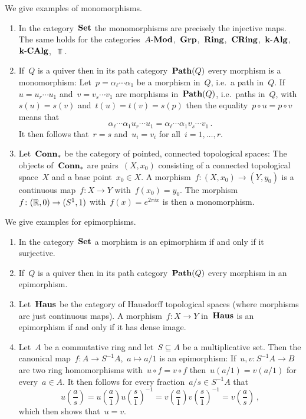 \begin{example}
  We give examples of monomorphisms.
  \begin{enumerate}
    \item
      In the category~$\mathbf{Set}$ the monomorphisms are precisely the injective maps.
      The same holds for the categories~$\text{$A$-$\mathbf{Mod}$}$,~$\mathbf{Grp}$,~$\mathbf{Ring}$,~$\mathbf{CRing}$,~$\text{$\mathbf{k}$-$\mathbf{Alg}$}$,~$\text{$\mathbf{k}$-$\mathbf{CAlg}$}$,~$\Top$.
    \item
      If~$Q$ is a quiver then in its path category~$\mathbf{Path}(Q)$ every morphism is a monomorphism:
      Let~$p = \alpha_\ell \dotsm \alpha_1$ be a morphism in~$Q$, i.e.\ a path in~$Q$.
      If~$u = u_r \dotsm u_1$ and~$v = v_s \dotsm v_1$ are morphisms in~$\mathbf{Path}(Q)$, i.e.\ paths in~$Q$, with~$s(u) = s(v)$ and~$t(u) = t(v) = s(p)$ then the equality~$p \circ u = p \circ v$ means that
      \[
          \alpha_\ell \dotsm \alpha_1 u_r \dotsm u_1
        = \alpha_\ell \dotsm \alpha_1 v_s \dotsm v_1 \,.
      \]
      It then follows that~$r = s$ and~$u_i = v_i$ for all~$i = 1, \dotsc, r$.
    \item
      Let~$\mathbf{Conn}_*$ be the category of pointed, connected topological spaces:
      The objects of~$\mathbf{Conn}_*$ are pairs~$(X, x_0)$ consisting of a connected topological space~$X$ and a base point~$x_0 \in X$.
      A morphism~$f \colon (X, x_0) \to (Y, y_0)$ is a continuous map~$f \colon X \to Y$ with~$f(x_0) = y_0$.
      The morphism~$f \colon (\mathbb{R}, 0) \to (S^1, 1)$ with~$f(x) = e^{2 \pi i x}$ is then a monomorphism.
  \end{enumerate}
\end{example}


\begin{example}
  We give examples for epimorphisms.
  \begin{enumerate}
    \item
      In the category~$\mathbf{Set}$ a morphism is an epimorphism if and only if it surjective.
    \item
      If~$Q$ is a quiver then in its path category~$\mathbf{Path}(Q)$ every morphism in an epimorphism.
    \item
      Let~$\mathbf{Haus}$ be the category of Hausdorff topological spaces (where morphisms are just continuous maps).
      A morphism~$f \colon X \to Y$ in~$\mathbf{Haus}$ is an epimorphism if and only if it has dense image.
    \item
      Let~$A$ be a commutative ring and let~$S \subseteq A$ be a multiplicative set.
      Then the canonical map~$f \colon A \to S^{-1} A$,~$a \mapsto a/1$ is an epimorphism:
      If~$u,v \colon S^{-1} A \to B$ are two ring homomorphisms with~$u \circ f = v \circ f$ then~$u(a/1) = v(a/1)$ for every~$a \in A$.
      It then follows for every fraction~$a/s \in S^{-1} A$ that
      \[
          u\left( \frac{a}{s} \right)
        = u\left( \frac{a}{1} \right) u\left( \frac{s}{1} \right)^{-1}
        = v\left( \frac{a}{1} \right) v\left( \frac{s}{1} \right)^{-1}
        = v\left( \frac{a}{s} \right) \,,
      \]
      which then shows that~$u = v$.
  \end{enumerate}
\end{example}





